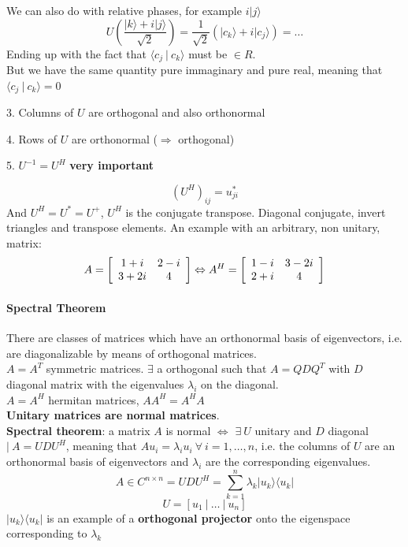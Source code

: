 \documentclass[10pt]{report}
\begin{document}
We can also do with relative phases, for example $i|j\rangle$ $$U\left(\frac{|k\rangle + i|j\rangle}{\sqrt{2}}\right) = \frac{1}{\sqrt{2}}\left(|c_k\rangle + i|c_j\rangle\right) = \ldots$$
Ending up with the fact that $\langle c_j\:|\:c_k\rangle$ must be $\in R$.\\
But we have the same quantity pure immaginary and pure real, meaning that $\langle c_j\:|\:c_k\rangle = 0$
\begin{list}{}{}
	\item[3.] Columns of $U$ are orthogonal and also orthonormal
	\item[4.] Rows of $U$ are orthonormal ($\Rightarrow$ orthogonal)
	\item[5.] $U^{-1} = U^H$ \textbf{very important}
\end{list}
$$(U^H)_{ij} = u^*_{ji}$$
And $U^H = U^* =U ^+$, $U^H$ is the conjugate transpose. Diagonal conjugate, invert triangles and transpose elements. An example with an arbitrary, non unitary, matrix:
$$A=\left[\begin{array}{c c}
1+i&2-i\\3+2i&4
\end{array}\right]\Leftrightarrow A^H=\left[\begin{array}{c c}
1-i & 3-2i\\2+i&4
\end{array}\right]$$
\paragraph{Spectral Theorem} There are classes of matrices which have an orthonormal basis of eigenvectors, i.e. are diagonalizable by means of orthogonal matrices.\\
$A = A^T$ symmetric matrices. $\exists$ a orthogonal such that $A = QDQ^T$ with $D$ diagonal matrix with the eigenvalues $\lambda_i$ on the diagonal.\\
$A = A^H$ hermitan matrices, $AA^H = A^HA$\\
\textbf{Unitary matrices are normal matrices}.\\
\textbf{Spectral theorem}: a matrix $A$ is normal $\Leftrightarrow$ $\exists\:U$ unitary and $D$ diagonal $|\:A=UDU^H$, meaning that $Au_i = \lambda_iu_i\:\forall\:i=1,\ldots,n$, i.e. the columns of $U$ are an orthonormal basis of eigenvectors and $\lambda_i$ are the corresponding eigenvalues.
$$A \in C^{n\times n} = UDU^H = \sum_{k=1}^n\lambda_k|u_k\rangle\langle u_k| $$
$$U = [u_1\:|\:\ldots\:|\:u_n]$$
$|u_k\rangle\langle u_k|$ is an example of a \textbf{orthogonal projector} onto the eigenspace corresponding to $\lambda_k$
\end{document}
